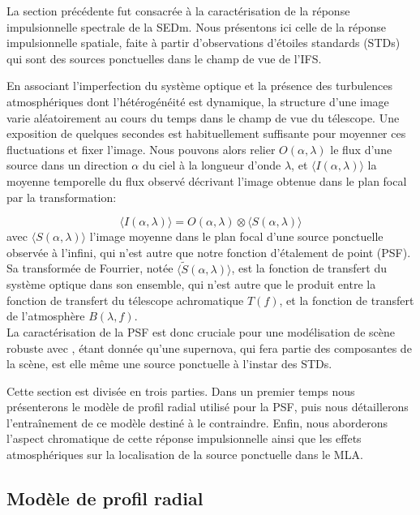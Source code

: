 \documentclass[../main/main.tex]{subfiles}
\begin{document}
La section précédente fut consacrée à la caractérisation de la réponse
impulsionnelle spectrale de la SEDm. Nous présentons ici celle de la
réponse impulsionnelle spatiale, faite à partir d'observations d'étoiles standards (STDs) qui
sont des sources ponctuelles dans le champ de vue de l'IFS.

En associant l'imperfection du système optique et la présence des
turbulences atmosphériques \citep{Kolmogorov} dont l'hétérogénéité est dynamique, la structure d'une image
varie aléatoirement au cours du temps dans le champ de vue du
télescope. Une exposition de quelques secondes est habituellement
suffisante pour moyenner ces fluctuations et fixer l'image. Nous
pouvons alors relier  $O(\alpha,\lambda)$ le flux d'une source dans un direction $\alpha$ du
ciel à la longueur d'onde $\lambda$, et $\langle
I(\alpha,\lambda)\rangle$ la moyenne temporelle du flux observé
décrivant l'image obtenue dans le plan focal par la
transformation:

\begin{equation}
  \label{eq:transfertpsf}
  \langle I(\alpha,\lambda)\rangle = O(\alpha,\lambda) \otimes \langle
  S(\alpha, \lambda)\rangle
\end{equation}
avec $\langle S(\alpha, \lambda)\rangle$ l'image moyenne dans le plan focal d'une
source ponctuelle observée à l'infini, qui n'est autre que notre
fonction d'étalement de point (PSF). Sa transformée de Fourrier, notée
$\langle \widetilde{S}(\alpha, \lambda)\rangle$, est la fonction
de transfert du système optique dans son ensemble, qui n'est autre que
le produit entre la fonction de transfert du télescope achromatique
$T(f)$, et la fonction de transfert de l'atmosphère $B(\lambda, f)$.\\

La caractérisation de la PSF est donc cruciale pour une
modélisation de scène robuste avec \hypergal, étant donnée qu'une
supernova, qui fera partie des composantes de la scène, est elle
même une source ponctuelle à l'instar des STDs.

Cette section est divisée en trois parties. Dans un premier temps nous
présenterons le modèle de profil radial utilisé pour la PSF, puis nous
détaillerons l'entraînement de ce modèle destiné à le contraindre. Enfin,
nous aborderons l'aspect chromatique de cette réponse
impulsionnelle ainsi que les effets atmosphériques sur la localisation de la
source ponctuelle dans le MLA.


\subsection{Modèle de profil radial}\label{ssec:radialpsf}
\end{document}
